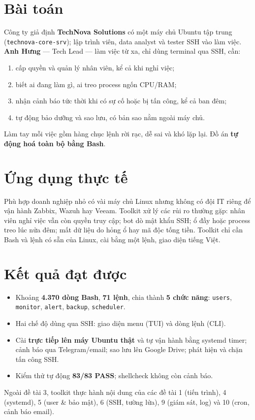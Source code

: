 \documentclass[12pt,a4paper,oneside]{report}
\newcommand{\cmd}[1]{\texttt{\small #1}}
\begin{document}
\section{Bài toán}
Công ty giả định \textbf{TechNova Solutions} có một máy chủ Ubuntu tập trung (\cmd{technova-core-srv}); lập trình viên, data analyst và tester SSH vào làm việc. \textbf{Anh Hưng} — Tech Lead — làm việc từ xa, chỉ dùng terminal qua SSH, cần:
\begin{enumerate}
  \item cấp quyền và quản lý nhân viên, kể cả khi nghỉ việc;
  \item biết ai đang làm gì, ai treo process ngốn CPU/RAM;
  \item nhận cảnh báo tức thời khi có sự cố hoặc bị tấn công, kể cả ban đêm;
  \item tự động bảo dưỡng và sao lưu, có bản sao nằm ngoài máy chủ.
\end{enumerate}
Làm tay mỗi việc gồm hàng chục lệnh rời rạc, dễ sai và khó lặp lại. Đồ án \textbf{tự động hoá toàn bộ bằng Bash}.

\section{Ứng dụng thực tế}
Phù hợp doanh nghiệp nhỏ có vài máy chủ Linux nhưng không có đội IT riêng để vận hành Zabbix, Wazuh hay Veeam. Toolkit xử lý các rủi ro thường gặp: nhân viên nghỉ việc vẫn còn quyền truy cập; bot dò mật khẩu SSH; ổ đầy hoặc process treo lúc nửa đêm; mất dữ liệu do hỏng ổ hay mã độc tống tiền. Toolkit chỉ cần Bash và lệnh có sẵn của Linux, cài bằng một lệnh, giao diện tiếng Việt.

\section{Kết quả đạt được}
\begin{itemize}
  \item Khoảng \textbf{4.370 dòng Bash}, \textbf{71 lệnh}, chia thành \textbf{5 chức năng}: \cmd{users}, \cmd{monitor}, \cmd{alert}, \cmd{backup}, \cmd{scheduler}.
  \item Hai chế độ dùng qua SSH: giao diện menu (TUI) và dòng lệnh (CLI).
  \item Cài \textbf{trực tiếp lên máy Ubuntu thật} và tự vận hành bằng systemd timer; cảnh báo qua Telegram/email; sao lưu lên Google Drive; phát hiện và chặn tấn công SSH.
  \item Kiểm thử tự động \textbf{83/83 PASS}; shellcheck không còn cảnh báo.
\end{itemize}
Ngoài đề tài 3, toolkit thực hành nội dung của các đề tài 1 (tiến trình), 4 (systemd), 5 (user \& bảo mật), 6 (SSH, tường lửa), 9 (giám sát, log) và 10 (cron, cảnh báo email).
\end{document}
